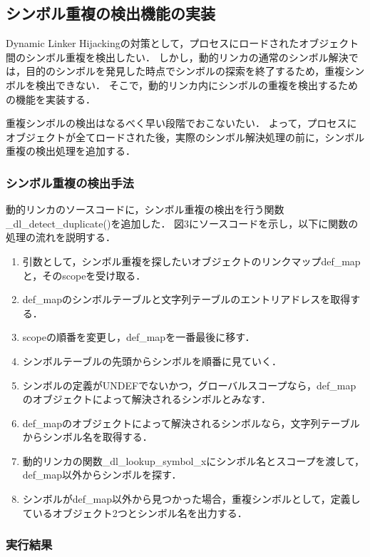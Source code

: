 \documentclass[submit,techreq,noauthor]{eco}	%
\begin{document}
\subsection{シンボル重複の検出機能の実装}
Dynamic Linker Hijackingの対策として，プロセスにロードされたオブジェクト間のシンボル重複を検出したい．
しかし，動的リンカの通常のシンボル解決では，目的のシンボルを発見した時点でシンボルの探索を終了するため，重複シンボルを検出できない．
そこで，動的リンカ内にシンボルの重複を検出するための機能を実装する．

重複シンボルの検出はなるべく早い段階でおこないたい．
よって，プロセスにオブジェクトが全てロードされた後，実際のシンボル解決処理の前に，シンボル重複の検出処理を追加する．\\

\subsubsection{シンボル重複の検出手法}
動的リンカのソースコードに，シンボル重複の検出を行う関数 \_dl\_detect\_duplicate()を追加した．
図3にソースコードを示し，以下に関数の処理の流れを説明する．

\begin{enumerate}
  \item 引数として，シンボル重複を探したいオブジェクトのリンクマップdef\_mapと，そのscopeを受け取る．
  \item def\_mapのシンボルテーブルと文字列テーブルのエントリアドレスを取得する．
  \item scopeの順番を変更し，def\_mapを一番最後に移す．
  \item シンボルテーブルの先頭からシンボルを順番に見ていく．
  \item シンボルの定義がUNDEFでないかつ，グローバルスコープなら，def\_mapのオブジェクトによって解決されるシンボルとみなす．
  \item def\_mapのオブジェクトによって解決されるシンボルなら，文字列テーブルからシンボル名を取得する．
  \item 動的リンカの関数\_dl\_lookup\_symbol\_xにシンボル名とスコープを渡して，def\_map以外からシンボルを探す．
  \item シンボルがdef\_map以外から見つかった場合，重複シンボルとして，定義しているオブジェクト2つとシンボル名を出力する．\\
\end{enumerate}

\subsubsection{実行結果}
\end{document}
